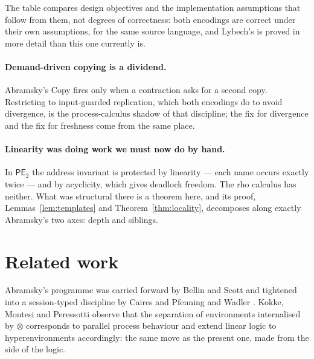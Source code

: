 \documentclass[11pt]{article}
\theoremstyle{definition}
\theoremstyle{plain}
\theoremstyle{remark}
\begin{document}
The table compares design objectives and the implementation assumptions
that follow from them, not degrees of correctness: both encodings are
correct under their own assumptions, for the same source language, and
Lybech's is proved in more detail than this one currently is.

\paragraph{Demand-driven copying is a dividend.}
Abramsky's Copy fires only when a contraction asks for a second copy.
Restricting to input-guarded replication, which both encodings do to
avoid divergence, is the process-calculus shadow of that discipline; the
fix for divergence and the fix for freshness come from the same place.

\paragraph{Linearity was doing work we must now do by hand.}
In $\mathsf{PE}_2$ the address invariant is protected by linearity --- each
name occurs exactly twice --- and by acyclicity, which gives deadlock
freedom. The rho calculus has neither. What was structural there is a
theorem here, and its proof, Lemmas~\ref{lem:templates} and
Theorem~\ref{thm:locality}, decomposes along exactly Abramsky's two axes:
depth and siblings.

\section{Related work}\label{sec:related}

Abramsky's programme was carried forward by Bellin and Scott
\cite{BellinScott94} and tightened into a session-typed discipline by
Caires and Pfenning \cite{CairesPfenning10} and Wadler \cite{Wadler14}.
Kokke, Montesi and Peressotti \cite{HCP} observe that the separation of
environments internalised by $\otimes$ corresponds to parallel process
behaviour and extend linear logic to hyperenvironments accordingly: the
same move as the present one, made from the side of the logic.
\end{document}
